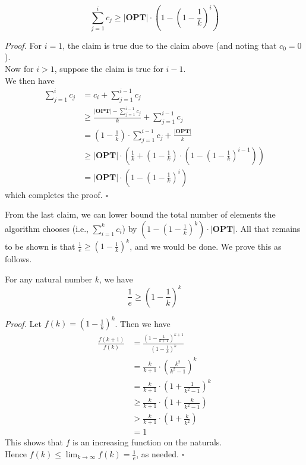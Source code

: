 \documentclass[a4paper]{article}
\newenvironment{proof}{\begin{breakbox}\textit{Proof.}}{\hfill$\square$\end{breakbox}}
\newcommand{\nl}{\vspace{0.2cm}\\}
\newcommand{\OPT}{\mathbf{OPT}}
\begin{document}
\begin{claim}
    $$\sum_{j = 1}^i c_j \ge |\OPT| \cdot \left(1 - \left(1 - \frac{1}{k}\right)^i\right)$$
\end{claim}
\begin{proof}
    For $i = 1$, the claim is true due to the claim above (and noting that $c_0 = 0$).\nl
    Now for $i > 1$, suppose the claim is true for $i - 1$.\nl
    We then have
    \begin{align*}
        \sum_{j = 1}^i c_j &= c_i + \sum_{j = 1}^{i - 1} c_j\\
                &\ge \frac{|\OPT| - \sum_{j = 1}^{i - 1} c_j}{k} + \sum_{j = 1}^{i - 1} c_j\\
                &= \left(1 - \frac{1}{k}\right) \cdot \sum_{j = 1}^{i - 1} c_j + \frac{|\OPT|}{k}\\
                &\ge |\OPT| \cdot \left(\frac{1}{k} + \left(1 - \frac{1}{k}\right)\cdot\left(1 - \left(1 - \frac{1}{k}\right)^{i - 1}\right) \right)\\
                &= |\OPT| \cdot \left(1 - \left(1 - \frac{1}{k}\right)^i\right)
    \end{align*}
    which completes the proof.
\end{proof}

From the last claim, we can lower bound the total number of elements the algorithm chooses (i.e., $\sum_{i=1}^k c_i$) by $\left(1 - \left(1 - \frac{1}{k}\right)^k\right) \cdot |\OPT|$. All that
remains to be shown is that $\frac{1}{e} \ge \left(1 - \frac{1}{k}\right)^k$, and we would be done. We prove this as follows.\nl

\begin{claim}
    For any natural number $k$, we have
    $$ \frac{1}{e} \ge \left(1 - \frac{1}{k}\right)^k $$
\end{claim}
\begin{proof}
    Let $f(k) = \left(1 - \frac{1}{k}\right)^k$. Then we have
    \begin{align*}
        \frac{f(k + 1)}{f(k)} &= \frac{\left(1 - \frac{1}{k + 1}\right)^{k+1}}{\left(1 - \frac{1}{k}\right)^k}\\
                              &= \frac{k}{k + 1} \cdot \left(\frac{k^2}{k^2 - 1}\right)^k\\
                              &= \frac{k}{k + 1} \cdot \left(1 + \frac{1}{k^2 - 1}\right)^k\\
                              &\ge \frac{k}{k + 1} \cdot \left(1 + \frac{k}{k^2 - 1}\right)\\
                              &> \frac{k}{k + 1} \cdot \left(1 + \frac{k}{k^2}\right)\\
                              &= 1
    \end{align*}
    This shows that $f$ is an increasing function on the naturals.\nl
    Hence $f(k) \le \lim_{k \to \infty} f(k) = \frac{1}{e}$, as needed.
\end{proof}
\end{document}
